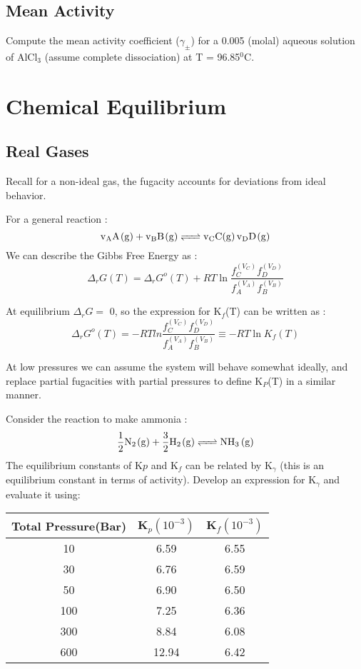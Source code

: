 \documentclass{article}
\newcommand{\be}{\begin{equation}}
\newcommand{\ee}{\end{equation}}
\begin{document}
\subsection{Mean Activity}
Compute the mean activity coefficient ($\gamma_\pm$) for a 0.005 (molal) aqueous solution of AlCl$_3$ (assume complete dissociation) at T = 96.85$^0$C. 


\section{Chemical Equilibrium}

\subsection{Real Gases}
Recall for a non-ideal gas, the fugacity accounts for deviations from ideal behavior. 
 
For a general reaction : 
\be
\ce{ v_AA(g) + v_BB(g) <=> v_CC(g)  v_DD(g)} 
\ee
We can describe the Gibbs Free Energy as : 
\be
\Delta_rG(T) = \Delta_rG^o(T) + RT\ln\frac{f^{(V_C)}_Cf^{(V_D)}_D}{f^{(V_A)}_Af^{(V_B)}_B}
\ee

At equilibrium $\Delta_rG = $ 0, so the expression for K$_f$(T) can be written as : 
\be
\Delta_rG^o(T) = - RTln\frac{f^{(V_C)}_Cf^{(V_D)}_D}{f^{(V_A)}_Af^{(V_B)}_B} \equiv -RT \ln K_f(T)
\ee

At low pressures we can assume the system will behave somewhat ideally, and replace partial fugacities with partial pressures to define K$_P$(T) in a similar manner. 

\bigskip

 Consider the reaction to make ammonia :
 \be
\ce{ \frac{1}{2}N_2(g) + \frac{3}{2}H_2(g) <=> NH_3 (g)}
 \ee
 The equilibrium constants of K$p$ and K$_f$ can be related by K$_\gamma$ (this is an equilibrium constant in terms of activity). 
 Develop an expression for K$_\gamma$ and evaluate it using: 
 
 \begin{center}
 \begin{tabular}{|c | c | c |} 
 \hline
 Total Pressure(Bar) & K$_p(10^{-3})$ & K$_f({10^{-3}})$  \\ [0.5ex] 
 \hline
 10 & 6.59 & 6.55  \\ 
 \hline
 30 & 6.76 & 6.59  \\
 \hline
 50 & 6.90 & 6.50  \\
 \hline
 100 & 7.25 & 6.36  \\
 \hline
 300 & 8.84 & 6.08  \\  
 \hline
 600 & 12.94 & 6.42 \\ 
 \hline
\end{tabular}
\end{center}
\end{document}
